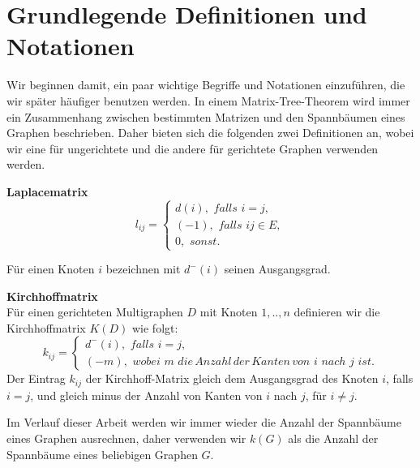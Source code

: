\section{Grundlegende Definitionen und Notationen}
Wir beginnen damit, ein paar wichtige Begriffe und Notationen einzuführen, die wir später häufiger benutzen werden.
In einem Matrix-Tree-Theorem wird immer ein Zusammenhang zwischen bestimmten Matrizen und den Spannbäumen eines Graphen beschrieben. Daher bieten sich die folgenden zwei Definitionen an, wobei wir eine für ungerichtete und die andere für gerichtete Graphen verwenden werden.
\begin{Df}\textbf{Laplacematrix}\\
$$
l_{ij}=
\begin{cases}
 d(i),\, \, falls\,\, i=j,\\
 (-1), \, \, falls \,\, ij \in E,\\
 0, \,\, sonst.
\end{cases}
$$
\end{Df}
Für einen Knoten $i$ bezeichnen mit $d^{-}(i)$ seinen Ausgangsgrad.\\
\begin{Df}\textbf{Kirchhoffmatrix}\\
 Für einen gerichteten Multigraphen $D$ mit Knoten $1,..,n$ definieren wir die Kirchhoffmatrix $K(D)$ wie folgt:\\
 $$
k_{ij}=
\begin{cases}
 d^{-}(i),\, \, falls\,\, i=j,\\
 (-m), \, \, wobei \,\, m \,\, die\, Anzahl\, der\, Kanten\, von\,\, i\,\, nach \,\,j\,\, ist.
\end{cases}
$$
Der Eintrag $k_{ij}$ der Kirchhoff-Matrix gleich dem Ausgangsgrad des Knoten $i$, falls $i=j$, und gleich minus der Anzahl von Kanten von $i$ nach $j$, für $i \neq j$.
\end{Df}
Im Verlauf dieser Arbeit werden wir immer wieder die Anzahl der Spannbäume eines Graphen ausrechnen, daher verwenden wir $\mathit{k}(G)$ als die Anzahl der Spannbäume eines beliebigen Graphen $G$.
